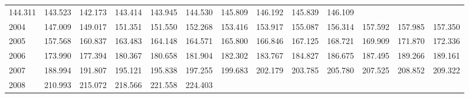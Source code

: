 \begin{tabular}{lllllllllllll}
  \multicolumn{1}{r}{144.311} &
  \multicolumn{1}{r}{143.523} &
  \multicolumn{1}{r}{142.173} &
  \multicolumn{1}{r}{143.414} &
  \multicolumn{1}{r}{143.945} &
  \multicolumn{1}{r}{144.530} &
  \multicolumn{1}{r}{145.809} &
  \multicolumn{1}{r}{146.192} &
  \multicolumn{1}{r}{145.839} &
  \multicolumn{1}{r}{146.109} \\
\multicolumn{1}{l}{\hspace{1em}2004} &
  \multicolumn{1}{|r}{147.009} &
  \multicolumn{1}{r}{149.017} &
  \multicolumn{1}{r}{151.351} &
  \multicolumn{1}{r}{151.550} &
  \multicolumn{1}{r}{152.268} &
  \multicolumn{1}{r}{153.416} &
  \multicolumn{1}{r}{153.917} &
  \multicolumn{1}{r}{155.087} &
  \multicolumn{1}{r}{156.314} &
  \multicolumn{1}{r}{157.592} &
  \multicolumn{1}{r}{157.985} &
  \multicolumn{1}{r}{157.350} \\
\multicolumn{1}{l}{\hspace{1em}2005} &
  \multicolumn{1}{|r}{157.568} &
  \multicolumn{1}{r}{160.837} &
  \multicolumn{1}{r}{163.483} &
  \multicolumn{1}{r}{164.148} &
  \multicolumn{1}{r}{164.571} &
  \multicolumn{1}{r}{165.800} &
  \multicolumn{1}{r}{166.846} &
  \multicolumn{1}{r}{167.125} &
  \multicolumn{1}{r}{168.721} &
  \multicolumn{1}{r}{169.909} &
  \multicolumn{1}{r}{171.870} &
  \multicolumn{1}{r}{172.336} \\
\multicolumn{1}{l}{\hspace{1em}2006} &
  \multicolumn{1}{|r}{173.990} &
  \multicolumn{1}{r}{177.394} &
  \multicolumn{1}{r}{180.367} &
  \multicolumn{1}{r}{180.658} &
  \multicolumn{1}{r}{181.904} &
  \multicolumn{1}{r}{182.302} &
  \multicolumn{1}{r}{183.767} &
  \multicolumn{1}{r}{184.827} &
  \multicolumn{1}{r}{186.675} &
  \multicolumn{1}{r}{187.495} &
  \multicolumn{1}{r}{189.266} &
  \multicolumn{1}{r}{189.161} \\
\multicolumn{1}{l}{\hspace{1em}2007} &
  \multicolumn{1}{|r}{188.994} &
  \multicolumn{1}{r}{191.807} &
  \multicolumn{1}{r}{195.121} &
  \multicolumn{1}{r}{195.838} &
  \multicolumn{1}{r}{197.255} &
  \multicolumn{1}{r}{199.683} &
  \multicolumn{1}{r}{202.179} &
  \multicolumn{1}{r}{203.785} &
  \multicolumn{1}{r}{205.780} &
  \multicolumn{1}{r}{207.525} &
  \multicolumn{1}{r}{208.852} &
  \multicolumn{1}{r}{209.322} \\
\multicolumn{1}{l}{\hspace{1em}2008} &
  \multicolumn{1}{|r}{210.993} &
  \multicolumn{1}{r}{215.072} &
  \multicolumn{1}{r}{218.566} &
  \multicolumn{1}{r}{221.558} &
  \multicolumn{1}{r}{224.403} &

\end{tabular}
